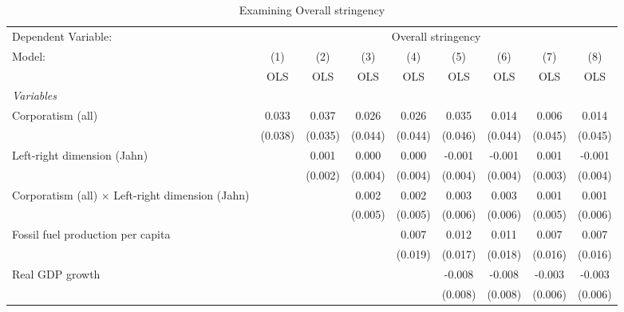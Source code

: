 
\begin{table}[htbp]
   \caption{Examining Overall stringency}
   \centering
   \begin{tabular}{lcccccccc}
      \toprule
      Dependent Variable: & \multicolumn{8}{c}{Overall stringency}\\
      Model:                                                  & (1)     & (2)     & (3)     & (4)     & (5)     & (6)     & (7)     & (8)\\  
                                                              &  OLS    & OLS     & OLS     & OLS     & OLS     & OLS     & OLS     & OLS\\  
      \midrule
      \emph{Variables}\\
      Corporatism (all)                                       & 0.033   & 0.037   & 0.026   & 0.026   & 0.035   & 0.014   & 0.006   & 0.014\\   
                                                              & (0.038) & (0.035) & (0.044) & (0.044) & (0.046) & (0.044) & (0.045) & (0.045)\\   
      Left-right dimension (Jahn)                             &         & 0.001   & 0.000   & 0.000   & -0.001  & -0.001  & 0.001   & -0.001\\   
                                                              &         & (0.002) & (0.004) & (0.004) & (0.004) & (0.004) & (0.003) & (0.004)\\   
      Corporatism (all) $\times$ Left-right dimension (Jahn)  &         &         & 0.002   & 0.002   & 0.003   & 0.003   & 0.001   & 0.001\\   
                                                              &         &         & (0.005) & (0.005) & (0.006) & (0.006) & (0.005) & (0.006)\\   
      Fossil fuel production per capita                       &         &         &         & 0.007   & 0.012   & 0.011   & 0.007   & 0.007\\   
                                                              &         &         &         & (0.019) & (0.017) & (0.018) & (0.016) & (0.016)\\   
      Real GDP growth                                         &         &         &         &         & -0.008  & -0.008  & -0.003  & -0.003\\   
                                                              &         &         &         &         & (0.008) & (0.008) & (0.006) & (0.006)\\   

\end{tabular}
\end{table}
